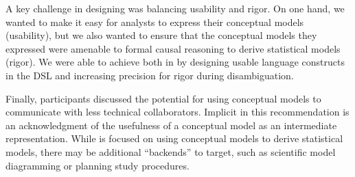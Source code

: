 A key challenge in designing \rTisane was balancing usability and rigor. On one
hand, we wanted to make it easy for analysts to express their conceptual models
(usability), but we also wanted to ensure that the conceptual models they
expressed were amenable to formal causal reasoning to derive statistical models
(rigor). We were able to achieve both in \rTisane by designing usable language
constructs in the DSL and increasing precision for rigor during disambiguation.

Finally, participants discussed the potential for using conceptual models to
communicate with less technical collaborators. Implicit in this recommendation
is an acknowledgment of the usefulness of a conceptual model as an intermediate
representation. While \rTisane is focused on using conceptual models to derive
statistical models, there may be additional ``backends'' to target, such as
scientific model diagramming or planning study procedures. 




